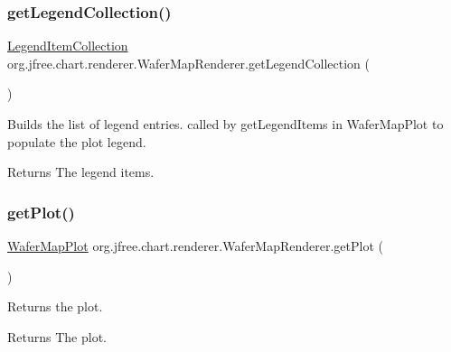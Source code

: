 \subsubsection{\texorpdfstring{get\+Legend\+Collection()}{getLegendCollection()}}
{\footnotesize\ttfamily \mbox{\hyperlink{classorg_1_1jfree_1_1chart_1_1_legend_item_collection}{Legend\+Item\+Collection}} org.\+jfree.\+chart.\+renderer.\+Wafer\+Map\+Renderer.\+get\+Legend\+Collection (\begin{DoxyParamCaption}{ }\end{DoxyParamCaption})}

Builds the list of legend entries. called by get\+Legend\+Items in Wafer\+Map\+Plot to populate the plot legend.

\begin{DoxyReturn}{Returns}
The legend items. 
\end{DoxyReturn}
\mbox{\label{classorg_1_1jfree_1_1chart_1_1renderer_1_1_wafer_map_renderer_ae33e31575551c04a63d40c1add9a32dc}} 
\subsubsection{\texorpdfstring{get\+Plot()}{getPlot()}}
{\footnotesize\ttfamily \mbox{\hyperlink{classorg_1_1jfree_1_1chart_1_1plot_1_1_wafer_map_plot}{Wafer\+Map\+Plot}} org.\+jfree.\+chart.\+renderer.\+Wafer\+Map\+Renderer.\+get\+Plot (\begin{DoxyParamCaption}{ }\end{DoxyParamCaption})}

Returns the plot.

\begin{DoxyReturn}{Returns}
The plot. 
\end{DoxyReturn}
\mbox{\label{classorg_1_1jfree_1_1chart_1_1renderer_1_1_wafer_map_renderer_a84afb08dedece5b7e0a6e8f7641005f1}} 
